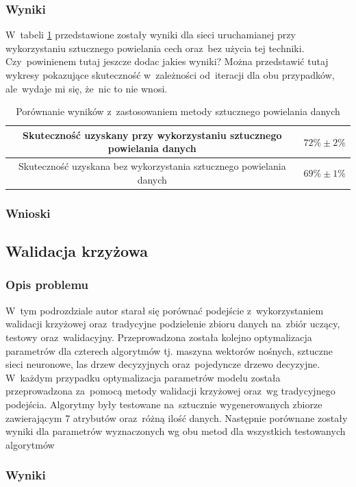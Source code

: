 \subsubsection{Wyniki}
W~tabeli \ref{table:catdogs} przedstawione zostały wyniki dla sieci uruchamianej przy wykorzystaniu sztucznego powielania cech oraz~bez użycia tej techniki. Czy~powinienem tutaj jeszcze dodac jakies wyniki? Można przedstawić tutaj wykresy pokazujące skuteczność w~zależności od~iteracji dla obu przypadków, ale~wydaje mi się, że~nic to nie wnosi.

\begin{table}
\centering
\begin{tabular}{|c|c|}
\hline
Skuteczność uzyskany przy wykorzystaniu sztucznego powielania danych & $72\% \pm 2\%$ \\
\hline 
Skuteczność uzyskana bez wykorzystania sztucznego powielania danych & $69\% \pm 1\%$ \\
\hline 
 \end{tabular}
 \caption{Porównanie wyników z~zastosowaniem metody sztucznego powielania danych} \label{table:catdogs}
\end{table}

\subsubsection{Wnioski}

\subsection{Walidacja krzyżowa}
\subsubsection{Opis problemu}
W~tym podrozdziale autor starał się porównać podejście z~wykorzystaniem walidacji krzyżowej oraz~tradycyjne podzielenie zbioru danych na~zbiór uczący, testowy oraz~walidacyjny. Przeprowadzona została kolejno optymalizacja parametrów dla czterech algorytmów tj. maszyna wektorów nośnych, sztuczne sieci neuronowe, las drzew decyzyjnych oraz~pojedyncze drzewo decyzyjne. W~każdym przypadku optymalizacja parametrów modelu została przeprowadzona za~pomocą metody walidacji krzyżowej oraz~wg tradycyjnego podejścia.  Algorytmy były testowane na~sztucznie wygenerowanych zbiorze zawierającym 7 atrybutów oraz~różną ilość danych. Następnie porównane zostały wyniki dla parametrów wyznaczonych wg obu metod dla wszystkich testowanych algorytmów
\subsubsection{Wyniki}
